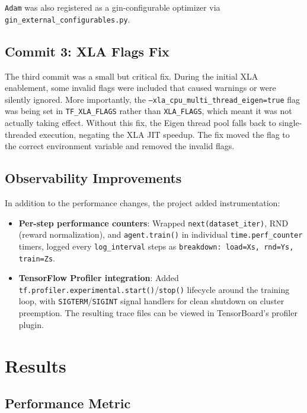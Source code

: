 \documentclass[10pt]{article}
\begin{document}
\texttt{Adam} was also registered as a gin-configurable optimizer via \texttt{gin\_external\_configurables.py}.

\subsection{Commit 3: XLA Flags Fix}

The third commit was a small but critical fix. During the initial XLA enablement, some invalid flags were included that caused warnings or were silently ignored. More importantly, the \texttt{--xla\_cpu\_multi\_thread\_eigen=true} flag was being set in \texttt{TF\_XLA\_FLAGS} rather than \texttt{XLA\_FLAGS}, which meant it was not actually taking effect. Without this fix, the Eigen thread pool falls back to single-threaded execution, negating the XLA JIT speedup. The fix moved the flag to the correct environment variable and removed the invalid flags.

\subsection{Observability Improvements}

In addition to the performance changes, the project added instrumentation:

\begin{itemize}
    \item \textbf{Per-step performance counters}: Wrapped \texttt{next(dataset\_iter)}, RND (reward normalization), and \texttt{agent.train()} in individual \texttt{time.perf\_counter} timers, logged every \texttt{log\_interval} steps as \texttt{breakdown: load=Xs, rnd=Ys, train=Zs}.
    \item \textbf{TensorFlow Profiler integration}: Added \texttt{tf.profiler.experimental.start()}/\texttt{stop()} lifecycle around the training loop, with \texttt{SIGTERM}/\texttt{SIGINT} signal handlers for clean shutdown on cluster preemption. The resulting trace files can be viewed in TensorBoard's profiler plugin.
\end{itemize}

\section{Results}

\subsection{Performance Metric}
\end{document}

